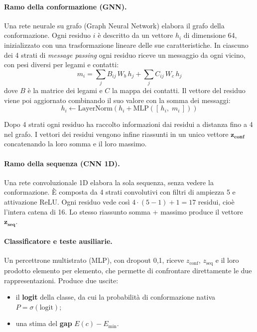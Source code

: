 \documentclass[11pt,a4paper]{article}
\newcommand{\Emin}{E_{\min}}
\newcommand{\zconf}{z_{\text{conf}}}
\newcommand{\zseq}{z_{\text{seq}}}
\begin{document}
\paragraph{Ramo della conformazione (GNN).} Una rete neurale su grafo (Graph Neural Network) elabora il grafo della conformazione. Ogni residuo $i$ è descritto da un vettore $h_i$ di dimensione 64, inizializzato con una trasformazione lineare delle sue caratteristiche. In ciascuno dei 4 strati di \emph{message passing} ogni residuo riceve un messaggio da ogni vicino, con pesi diversi per legami e contatti:
\begin{equation*}
  m_i = \sum_{j} B_{ij} \, W_b \, h_j + \sum_{j} C_{ij} \, W_c \, h_j
\end{equation*}
dove $B$ è la matrice dei legami e $C$ la mappa dei contatti. Il vettore del residuo viene poi aggiornato combinando il suo valore con la somma dei messaggi:
\begin{equation*}
  h_i \leftarrow \mathrm{LayerNorm}\left(h_i + \mathrm{MLP}\left([\,h_i,\; m_i\,]\right)\right)
\end{equation*}

Dopo 4 strati ogni residuo ha raccolto informazioni dai residui a distanza fino a 4 nel grafo. I vettori dei residui vengono infine riassunti in un unico vettore $\boldsymbol{\zconf}$ concatenando la loro somma e il loro massimo.

\paragraph{Ramo della sequenza (CNN 1D).} Una rete convoluzionale 1D elabora la sola sequenza, senza vedere la conformazione. È composta da 4 strati convolutivi con filtri di ampiezza 5 e attivazione ReLU. Ogni residuo vede così $4 \cdot (5 - 1) + 1 = 17$ residui, cioè l'intera catena di 16. Lo stesso riassunto somma + massimo produce il vettore $\boldsymbol{\zseq}$.

\paragraph{Classificatore e teste ausiliarie.} Un percettrone multistrato (MLP), con dropout 0,1, riceve $\zconf$, $\zseq$ e il loro prodotto elemento per elemento, che permette di confrontare direttamente le due rappresentazioni. Produce due uscite:
\begin{itemize}
  \item il \textbf{logit} della classe, da cui la probabilità di conformazione nativa $P = \sigma(\text{logit})$;
  \item una stima del \textbf{gap} $E(c) - \Emin$.
\end{itemize}
\end{document}
